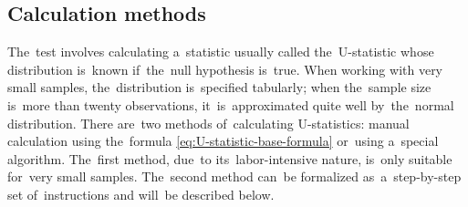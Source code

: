 \documentclass[russian,english]{scrreprt}
\begin{document}
\subsection{Calculation methods}
The~test involves calculating a~statistic usually called the~U-statistic whose distribution is~known if~the~null hypothesis is~true. When working with very small samples, the~distribution is~specified tabularly; when the~sample size is~more than twenty observations, it~is~approximated quite well by~the~normal distribution. There are~two methods of~calculating U-statistics: manual calculation using the~formula \ref{eq:U-statistic-base-formula} or~using a~special algorithm. The~first method, due~to its~labor-intensive nature, is~only suitable for~very small samples. The~second method can~be formalized as~a~step-by-step set of~instructions and will~be described below.
\end{document}
